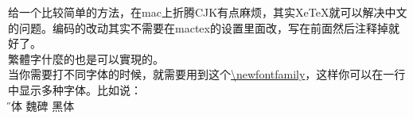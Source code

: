 \documentclass[12pt]{article} %
\begin{document}
\thispagestyle{empty}
\small{给一个比较简单的方法，在mac上折腾CJK有点麻烦，其实XeTeX就可以解决中文的问题。编码的改动其实不需要在mactex的设置里面改，写在前面然后注释掉就好了。\\
繁體字什麼的也是可以實現的。\\
当你需要打不同字体的时候，就需要用到这个\url{\newfontfamily}，这样你可以在一行中显示多种字体。比如说：\\}
\Huge{{\H 宋体} {\E 魏碑} 黑体}
\end{document}
